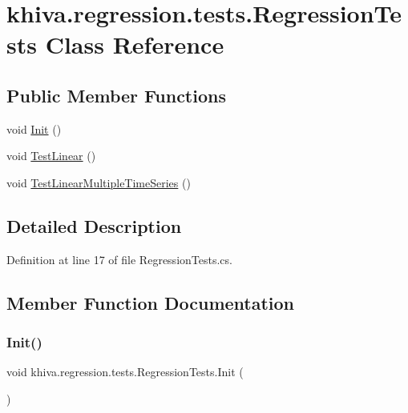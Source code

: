 \hypertarget{classkhiva_1_1regression_1_1tests_1_1_regression_tests}{}\section{khiva.\+regression.\+tests.\+Regression\+Tests Class Reference}
\label{classkhiva_1_1regression_1_1tests_1_1_regression_tests}
\subsection*{Public Member Functions}
\begin{DoxyCompactItemize}
\item 
void \mbox{\hyperlink{classkhiva_1_1regression_1_1tests_1_1_regression_tests_a1a3a01aba829690e2b9d490279f63247}{Init}} ()
\item 
void \mbox{\hyperlink{classkhiva_1_1regression_1_1tests_1_1_regression_tests_a280a8aa6664ff39f71b00ab262fafb49}{Test\+Linear}} ()
\item 
void \mbox{\hyperlink{classkhiva_1_1regression_1_1tests_1_1_regression_tests_a4b3779772a551679193d55aad3e81e70}{Test\+Linear\+Multiple\+Time\+Series}} ()
\end{DoxyCompactItemize}


\subsection{Detailed Description}


Definition at line 17 of file Regression\+Tests.\+cs.



\subsection{Member Function Documentation}
\mbox{\label{classkhiva_1_1regression_1_1tests_1_1_regression_tests_a1a3a01aba829690e2b9d490279f63247}} 
\subsubsection{\texorpdfstring{Init()}{Init()}}
{\footnotesize\ttfamily void khiva.\+regression.\+tests.\+Regression\+Tests.\+Init (\begin{DoxyParamCaption}{ }\end{DoxyParamCaption})\hspace{0.3cm}{\ttfamily [inline]}}



